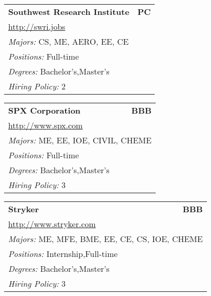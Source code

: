\documentclass[twoside]{article}
\begin{document}
\begin{center}
\begin{multicols}{3}
\begin{FlushLeft}
\begin{minipage}{\columnwidth}
\end{minipage}
 
\begin{minipage}{\columnwidth}\begin{tabularx}{.95\columnwidth}{Xr}
                 {\Large\bf Southwest Research Institute} & {\Large\bf PC}\\
    \multicolumn{2}{p{.95\columnwidth}}{\url{http://swri.jobs}}\\
    \multicolumn{2}{p{.95\columnwidth}}{\emph{Majors:} CS, ME, AERO, EE, CE}\\
    \multicolumn{2}{p{.95\columnwidth}}{\emph{Positions:} Full-time}\\
    \multicolumn{2}{p{.95\columnwidth}}{\emph{Degrees:} Bachelor's,Master's}\\
    \multicolumn{2}{p{.95\columnwidth}}{\emph{Hiring Policy:} 2}\\
    \end{tabularx}
    
\end{minipage}
 
\begin{minipage}{\columnwidth}\begin{tabularx}{.95\columnwidth}{Xr}
                 {\Large\bf SPX Corporation} & {\Large\bf BBB}\\
    \multicolumn{2}{p{.95\columnwidth}}{\url{http://www.spx.com}}\\
    \multicolumn{2}{p{.95\columnwidth}}{\emph{Majors:} ME, EE, IOE, CIVIL, CHEME}\\
    \multicolumn{2}{p{.95\columnwidth}}{\emph{Positions:} Full-time}\\
    \multicolumn{2}{p{.95\columnwidth}}{\emph{Degrees:} Bachelor's,Master's}\\
    \multicolumn{2}{p{.95\columnwidth}}{\emph{Hiring Policy:} 3}\\
    \end{tabularx}
    
\end{minipage}
 
\begin{minipage}{\columnwidth}\begin{tabularx}{.95\columnwidth}{Xr}
                 {\Large\bf Stryker} & {\Large\bf BBB}\\
    \multicolumn{2}{p{.95\columnwidth}}{\url{http://www.stryker.com}}\\
    \multicolumn{2}{p{.95\columnwidth}}{\emph{Majors:} ME, MFE, BME, EE, CE, CS, IOE, CHEME}\\
    \multicolumn{2}{p{.95\columnwidth}}{\emph{Positions:} Internship,Full-time}\\
    \multicolumn{2}{p{.95\columnwidth}}{\emph{Degrees:} Bachelor's,Master's}\\
    \multicolumn{2}{p{.95\columnwidth}}{\emph{Hiring Policy:} 3}\\
    \end{tabularx}
    

\end{minipage}
\end{FlushLeft}
\end{multicols}
\end{center}
\end{document}
